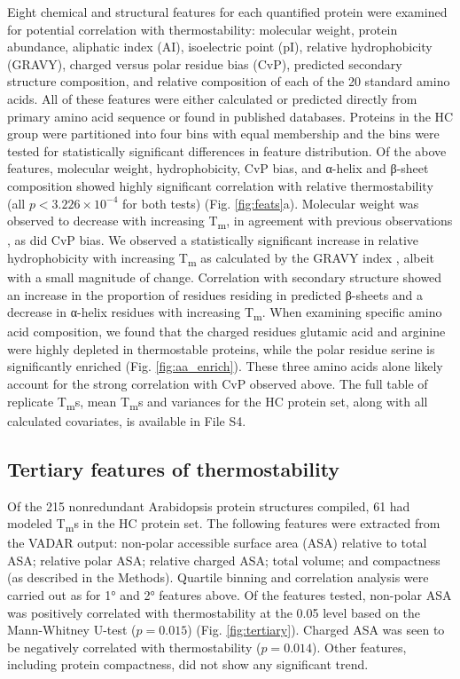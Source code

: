 \documentclass[11pt,letter]{article}\usepackage[]{graphicx}\usepackage[]{color}
\newcommand{\Tm}{T\textsubscript{m}}
\newcommand{\primary}{1°}
\newcommand{\secondary}{2°}
\newcommand{\ahelix}{α-helix}
\newcommand{\bsheet}{β-sheet}
\begin{document}
Eight chemical and structural features for each quantified protein were
examined for potential correlation with thermostability: molecular weight,
protein abundance, aliphatic index (AI), isoelectric point (pI), relative
hydrophobicity (GRAVY), charged versus polar residue bias (CvP), predicted
secondary structure composition, and relative composition of each of the 20
standard amino acids. All of these features were either calculated or
predicted directly from primary amino acid sequence or found in published
databases. Proteins in the HC group were partitioned into four
bins with equal membership and the bins were tested for statistically
significant differences in feature distribution. Of the above features,
molecular weight, hydrophobicity, CvP bias, and \ahelix{} and \bsheet{}
composition showed highly significant correlation with relative
thermostability (all $p < \ensuremath{3.226\times 10^{-4}}$ for both tests) (Fig.
\ref{fig:feats}a). Molecular weight was observed to decrease with increasing
\Tm{}, in agreement with previous observations \cite{ghosh_computing_2009,
leuenberger_cell-wide_2017}, as did CvP bias. We observed a statistically
significant increase in relative hydrophobicity with increasing \Tm{} as
calculated by the GRAVY index \cite{kyte_simple_1982}, albeit with a small
magnitude of change. Correlation with secondary structure showed an increase
in the proportion of residues residing in predicted \bsheet{}s and a decrease
in \ahelix{} residues with increasing \Tm{}. When examining specific amino
acid composition, we found that the charged residues glutamic acid and
arginine were highly depleted in thermostable proteins, while the polar
residue serine is significantly enriched (Fig. \ref{fig:aa_enrich}). These
three amino acids alone likely account for the strong correlation with CvP
observed above. The full table of replicate \Tm{}s, mean \Tm{}s and variances
for the HC protein set, along with all calculated covariates,
is available in File S4.

\subsection*{Tertiary features of thermostability}

Of the 215 nonredundant Arabidopsis protein structures
compiled, 61 had modeled \Tm{}s in the HC
protein set. The following features were extracted from the VADAR output:
non-polar accessible surface area (ASA) relative to total ASA; relative polar
ASA; relative charged ASA; total volume; and compactness (as described in the
Methods). Quartile binning and correlation analysis were carried out as for
\primary{} and \secondary{} features above. Of the features tested, non-polar
ASA was positively correlated with thermostability at the 0.05 level based on
the Mann-Whitney U-test ($p=0.015$) (Fig.
\ref{fig:tertiary}). Charged ASA was seen to be negatively correlated with
thermostability ($p=0.014$). Other features, including protein
compactness, did not show any significant trend.
\end{document}

